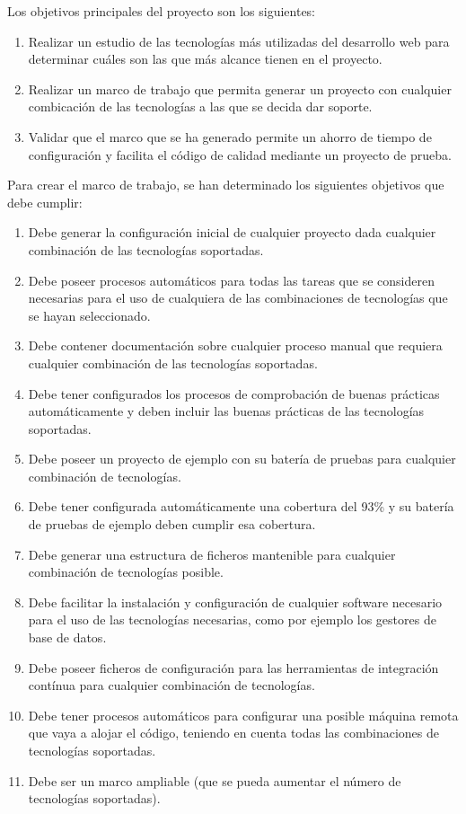 Los objetivos principales del proyecto son los siguientes:

\begin{enumerate}
  \item Realizar un estudio de las tecnologías más utilizadas del desarrollo web para determinar cuáles son las que más alcance tienen en el proyecto.
  \item Realizar un marco de trabajo que permita generar un proyecto con cualquier combicación de las tecnologías a las que se decida dar soporte.
  \item Validar que el marco que se ha generado permite un ahorro de tiempo de configuración y facilita el código de calidad mediante un proyecto de prueba.
\end{enumerate}

Para crear el marco de trabajo, se han determinado los siguientes objetivos que debe cumplir:

\begin{enumerate}
  \item Debe generar la configuración inicial de cualquier proyecto dada cualquier combinación de las tecnologías soportadas.
  \item Debe poseer procesos automáticos para todas las tareas que se consideren necesarias para el uso de cualquiera de las combinaciones de tecnologías que se hayan seleccionado.
  \item Debe contener documentación sobre cualquier proceso manual que requiera cualquier combinación de las tecnologías soportadas.
  \item Debe tener configurados los procesos de comprobación de buenas prácticas automáticamente y deben incluir las buenas prácticas de las tecnologías soportadas.
  \item Debe poseer un proyecto de ejemplo con su batería de pruebas para cualquier combinación de tecnologías.
  \item Debe tener configurada automáticamente una cobertura del 93\% y su batería de pruebas de ejemplo deben cumplir esa cobertura.
  \item Debe generar una estructura de ficheros mantenible para cualquier combinación de tecnologías posible.
  \item Debe facilitar la instalación y configuración de cualquier software necesario para el uso de las tecnologías necesarias, como por ejemplo los gestores de base de datos.
  \item Debe poseer ficheros de configuración para las herramientas de integración contínua para cualquier combinación de tecnologías.
  \item Debe tener procesos automáticos para configurar una posible máquina remota que vaya a alojar el código, teniendo en cuenta todas las combinaciones de tecnologías soportadas.
  \item Debe ser un marco ampliable (que se pueda aumentar el número de tecnologías soportadas).
\end{enumerate}
